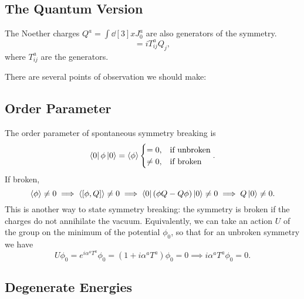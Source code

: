 
\subsection{The Quantum Version}%
\label{sub:the_quantum_version}

\begin{claim}
  The Noether charges $Q^{a} = \int \dd[3]{x} J^{a}_0$ are also generators of the symmetry.
  \begin{equation}
    [\phi_{i}, Q^{a}] = i T^{a}_{ij} Q_{j},
  \end{equation}
  where $T^{a}_{ij}$ are the generators.
\end{claim}

There are several points of observation we should make:

\subsection{Order Parameter}%
\label{sub:order_parameter}

The order parameter of spontaneous symmetry breaking is
\begin{equation}
  \bra{0} \phi \ket{0} = \langle \phi \rangle
  \begin{cases}
    = 0, & \text{if unbroken}  \\
    \neq 0, & \text{if broken} 
  \end{cases}.
\end{equation}
If broken,
\begin{equation}
  \langle \phi \rangle \neq 0 \implies \langle [\phi, Q] \rangle \neq 0 \implies \bra{0} (\phi Q - Q \phi) \ket{0} \neq 0 \implies Q \ket{0} \neq 0.
\end{equation}
This is another way to state symmetry breaking: the symmetry is broken if the charges do not annihilate the vacuum.
Equivalently, we can take an action $U$ of the group on the minimum of the potential $\phi_0$, so that for an unbroken symmetry we have
\begin{equation}
  U \phi_0 = e^{i \alpha^{a} T^{a}} \phi_0 = (1 + i \alpha^{a} T^{a}) \phi_0 = 0 \implies i \alpha^{a} T^{a} \phi_0 = 0.
\end{equation}

\subsection{Degenerate Energies}%
\label{sub:degenerate_energies}


